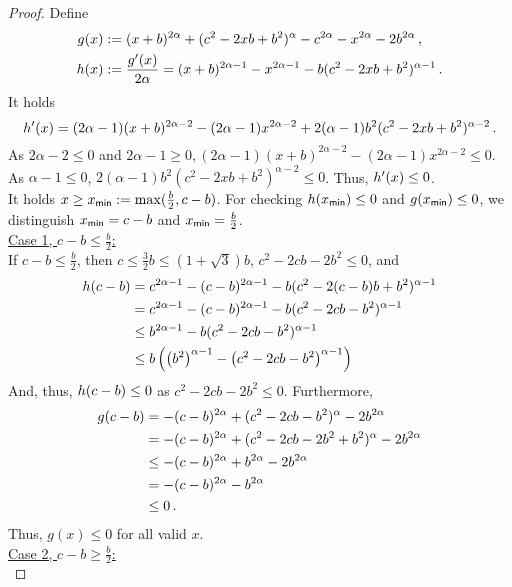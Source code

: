 %
\begin{proof}
	Define
	\begin{align*}
		g(x) &:=(x+b)^{2\alpha}+(c^2 - 2 x b + b^2)^\alpha - c^{2\alpha}-x^{2\alpha} - 2 b^{2\alpha} \, ,
		\\
		h(x) &:= \frac{g^\prime(x)}{2\alpha}
		=
		(x+b)^{2\alpha-1}-x^{2\alpha-1}-b(c^2 - 2 x b + b^2)^{\alpha -1}
		\, .
	\end{align*}
	It holds
	\begin{equation*}
		h^\prime(x)
		=
		(2\alpha-1)(x+b)^{2\alpha-2}-(2\alpha-1)x^{2\alpha-2}+2(\alpha -1) b^2(c^2 - 2 x b + b^2)^{\alpha -2}
		\, .
	\end{equation*}
	As $2\alpha-2 \leq 0$ and $2\alpha-1 \geq 0, (2\alpha-1)(x+b)^{2\alpha-2}-(2\alpha-1)x^{2\alpha-2}\leq 0$.
	As $\alpha-1\leq0$, $2(\alpha -1) b^2(c^2 - 2 x b + b^2)^{\alpha -2} \leq 0$.
	Thus, $h^\prime(x)\leq0$. \\
	It holds $x\geq x_{\mathsf{min}} := \max(\frac b2, c-b)$. For checking $h(x_{\mathsf{min}}) \leq 0$ and $g(x_{\mathsf{min}}) \leq 0$, we distinguish $x_{\mathsf{min}} = c-b$ and $x_{\mathsf{min}} = \frac b2$.\\
	\underline{Case 1, $c-b\leq\frac b2$:}\\
	If $c-b\leq\frac b2$, then $c\leq \frac32 b \leq (1+\sqrt{3})b$, $c^2 -2cb-2b^2\leq0$, and
	\begin{align*}
		h\!\left( c-b \right) 
		&= 
		c^{2\alpha-1}-(c-b)^{2\alpha-1}-b(c^2 - 2 (c-b) b + b^2)^{\alpha -1}
		\\&= 
		c^{2\alpha-1}-(c-b)^{2\alpha-1}-b(c^2 - 2 c b - b^2)^{\alpha -1}
		\\&\leq 
		b^{2\alpha-1}-b(c^2 - 2 c b - b^2)^{\alpha -1}
		\\&\leq 
		b \left( \left( b^2 \right)^{\alpha-1}-\left( c^2 - 2 c b - b^2 \right)^{\alpha -1} \right)
	\end{align*}
	And, thus, $h\!\left( c-b \right)  \leq 0$ as $c^2 -2cb-2b^2\leq0$.
	Furthermore,
	\begin{align*}
		g\!\left( c-b \right) 
		&=
		-(c-b)^{2\alpha}+(c^2 - 2 c b-b^2)^\alpha 
		- 2 b^{2\alpha} 
		\\&=
		-(c-b)^{2\alpha}+(c^2 - 2 c b-2b^2+b^2)^\alpha 
				- 2 b^{2\alpha} 
		\\&\leq 
		-(c-b)^{2\alpha}+b^{2\alpha }
		- 2 b^{2\alpha} 
		\\&=
		-(c-b)^{2\alpha}
		- b^{2\alpha} 
		\\&\leq
		0
		\, .
	\end{align*}
	Thus, $g(x)\leq 0$ for all valid $x$.\\
	\underline{Case 2, $c-b\geq\frac b2$:}\\

\end{proof}
